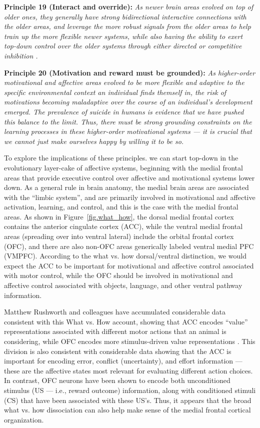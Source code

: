 \documentclass[11pt,twoside]{article}
\begin{document}
{\bf Principle 19 (Interact and override):} {\em As newer brain areas evolved
  on top of older ones, they generally have strong bidirectional interactive
  connections with the older areas, and leverage the more robust signals from
  the older areas to help train up the more flexible newer systems, while also
  having the ability to exert top-down control over the older systems through
  either directed or competitive inhibition \cite{MunakataHerdChathamEtAl11}.}

{\bf Principle 20 (Motivation and reward must be grounded):} {\em As
  higher-order motivational and affective areas evolved to be more flexible
  and adaptive to the specific environmental context an individual finds
  themself in, the risk of motivations becoming maladaptive over the course of
  an individual's development emerged.  The prevalence of suicide in humans is
  evidence that we have pushed this balance to the limit.  Thus, there must be
  strong grounding constraints on the learning processes in these higher-order
  motivational systems --- it is crucial that we cannot just make ourselves
  happy by willing it to be so.}

To explore the implications of these principles. we can start top-down in the
evolutionary layer-cake of affective systems, beginning with the medial
frontal areas that provide executive control over affective and motivational
systems lower down.  As a general rule in brain anatomy, the medial brain
areas are associated with the ``limbic system'', and are primarily involved in
motivational and affective activation, learning, and control, and this is the
case with the medial frontal areas.  As shown in Figure~\ref{fig.what_how},
the dorsal medial frontal cortex contains the anterior cingulate cortex (ACC),
while the ventral medial frontal areas (spreading over into ventral lateral)
include the orbital frontal cortex (OFC), and there are also non-OFC areas
generically labeled ventral medial PFC (VMPFC).  According to the what vs. how
dorsal/ventral distinction, we would expect the ACC to be important for
motivational and affective control associated with motor control, while the
OFC should be involved in motivational and affective control associated with
objects, language, and other ventral pathway information.

Matthew Rushworth and colleagues have accumulated considerable data consistent
with this What vs. How account, showing that ACC encodes ``value''
representations associated with different motor actions that an animal is
considering, while OFC encodes more stimulus-driven value representations \cite{RushworthBehrensRudebeckEtAl07,Rushworth08}.
This division is also consistent with considerable data showing that the ACC
is important for encoding error, conflict (uncertainty), and effort
information --- these are the affective states most relevant for evaluating
different action choices.  In contrast, OFC neurons have been shown to encode
both unconditioned stimulus (US --- i.e., reward outcome) information, along
with conditioned stimuli (CS) that have been associated with these US's.
Thus, it appears that the broad what vs. how dissociation can also help make
sense of the medial frontal cortical organization.
\end{document}
